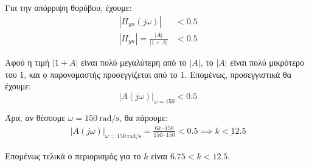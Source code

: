 \documentclass[11pt,a4paper,notitlepage,fleqn,final]{article}
\begin{document}
\begin{exercise}
Για την απόρριψη θορύβου, έχουμε:
\begin{align*}
	\left|H_{yn}(j\omega )\right| &< 0.5 \\
	\left|H_{yn}\right| = \frac{|A|}{|1+A|} &< 0.5
\end{align*}

Αφού η τιμή \( |1+A| \) είναι πολύ μεγαλύτερη από το \( |A| \), το \( |Α| \) είναι πολύ
μικρότερο του 1, και ο παρονομαστής προσεγγίζεται από το 1. Επομένως, προσεγγιστικά θα
έχουμε:
\[
\left|A(j\omega )\right|_{\omega =150} < 0.5
\]

Άρα, αν θέσουμε \( \omega = \SI{150}{\radian/\second} \), θα πάρουμε:
\begin{gather*}
	\left|A(j\omega )\right|_{\omega=\SI{150}{\radian/\second}}
	= \frac{6k\cdot 150}{150\cdot 150} < 0.5 \implies \underline{k < 12.5}
\end{gather*}

Επομένως τελικά ο περιορισμός για το \( k \) είναι \( 6.75 < k < 12.5 \).

\end{exercise}
\end{document}
